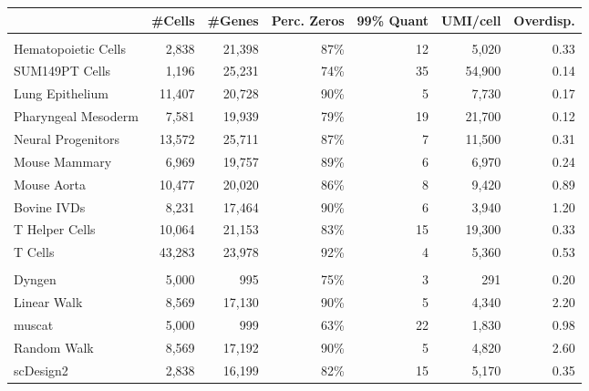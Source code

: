 \centering
\begin{tabular}[t]{lrrrrrr}
\toprule
  & \#Cells & \#Genes & Perc.
Zeros & 99\%
Quant & UMI/cell & Overdisp.\\
\midrule
\addlinespace[0mm]
\multicolumn{7}{l}{\textbf{Consistency}}\\
\hspace{1em}Hematopoietic Cells & 2,838 & 21,398 & 87\% & 12 & 5,020 & 0.33\\
\hspace{1em}SUM149PT Cells & 1,196 & 25,231 & 74\% & 35 & 54,900 & 0.14\\
\hspace{1em}Lung Epithelium & 11,407 & 20,728 & 90\% & 5 & 7,730 & 0.17\\
\hspace{1em}Pharyngeal Mesoderm & 7,581 & 19,939 & 79\% & 19 & 21,700 & 0.12\\
\hspace{1em}Neural Progenitors & 13,572 & 25,711 & 87\% & 7 & 11,500 & 0.31\\
\hspace{1em}Mouse Mammary & 6,969 & 19,757 & 89\% & 6 & 6,970 & 0.24\\
\hspace{1em}Mouse Aorta & 10,477 & 20,020 & 86\% & 8 & 9,420 & 0.89\\
\hspace{1em}Bovine IVDs & 8,231 & 17,464 & 90\% & 6 & 3,940 & 1.20\\
\hspace{1em}T Helper Cells & 10,064 & 21,153 & 83\% & 15 & 19,300 & 0.33\\
\hspace{1em}T Cells & 43,283 & 23,978 & 92\% & 4 & 5,360 & 0.53\\
\addlinespace[3mm]
\multicolumn{7}{l}{\textbf{Simulation}}\\
\hspace{1em}Dyngen & 5,000 & 995 & 75\% & 3 & 291 & 0.20\\
\hspace{1em}Linear Walk & 8,569 & 17,130 & 90\% & 5 & 4,340 & 2.20\\
\hspace{1em}muscat & 5,000 & 999 & 63\% & 22 & 1,830 & 0.98\\
\hspace{1em}Random Walk & 8,569 & 17,192 & 90\% & 5 & 4,820 & 2.60\\
\hspace{1em}scDesign2 & 2,838 & 16,199 & 82\% & 15 & 5,170 & 0.35\\

\end{tabular}
